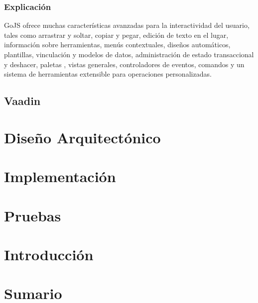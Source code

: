 \documentclass[a4paper,12pt]{article}
\newcounter{ns}
\begin{document}
	 	
	 		\subsubsection{Explicación}
	 		GoJS ofrece muchas características avanzadas para la interactividad del usuario, tales como arrastrar y soltar, copiar y pegar, edición de texto en el lugar, información sobre herramientas, menús contextuales, diseños automáticos, plantillas, vinculación y modelos de datos, administración de estado transaccional y deshacer, paletas , vistas generales, controladores de eventos, comandos y un sistema de herramientas extensible para operaciones personalizadas.
	 
	 
	 	\subsection{Vaadin}
	
	\afterpage{\null\newpage}
	\newpage
	
	\section{Diseño Arquitectónico}
	
	\afterpage{\null\newpage}
	\newpage
	
	\section{Implementación}
	
	\afterpage{\null\newpage}
	\newpage
	
	
	\section{Pruebas}
	
	\afterpage{\null\newpage}
	\newpage
	
	
	\section{Introducción}
	
	\afterpage{\null\newpage}
	\newpage
	
	
	\section{Sumario}
\end{document}
